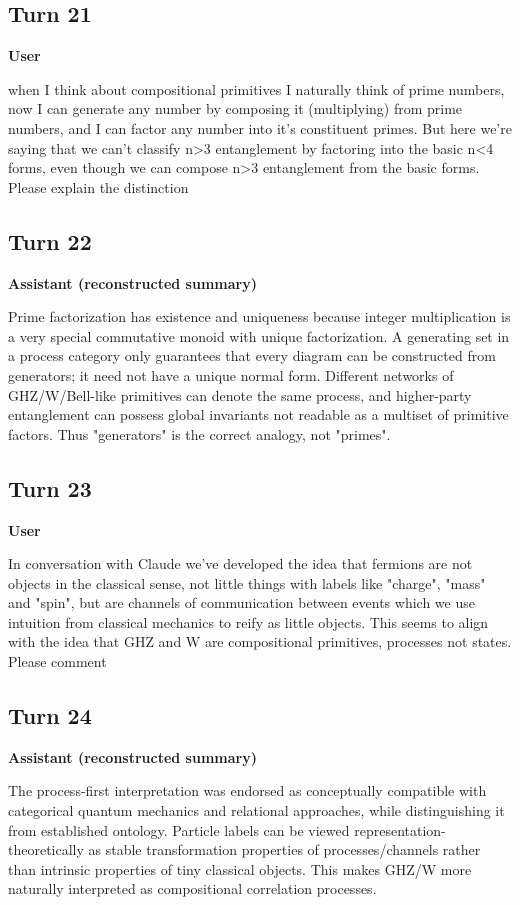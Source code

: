 \documentclass[11pt,a4paper]{article}
\newcommand{\speaker}[1]{\par\medskip\noindent\textbf{\large #1}\par\smallskip}
\begin{document}
\subsection*{Turn 21}
\speaker{User}
when I think about compositional primitives I naturally think of prime numbers, now I can generate any number by composing it (multiplying) from prime numbers, and I can factor any number into it's constituent primes. But here we're saying that we can't classify n>3 entanglement by factoring into the basic n<4 forms, even though we can compose n>3 entanglement from the basic forms. Please explain the distinction
\subsection*{Turn 22}
\speaker{Assistant (reconstructed summary)}
Prime factorization has existence and uniqueness because integer multiplication is a very special commutative monoid with unique factorization. A generating set in a process category only guarantees that every diagram can be constructed from generators; it need not have a unique normal form. Different networks of GHZ/W/Bell-like primitives can denote the same process, and higher-party entanglement can possess global invariants not readable as a multiset of primitive factors. Thus "generators" is the correct analogy, not "primes".
\subsection*{Turn 23}
\speaker{User}
In conversation with Claude we've developed the idea that fermions are not objects in the classical sense, not little things with labels like "charge", "mass" and "spin", but are channels of communication between events which we use intuition from classical mechanics to reify as little objects. This seems to align with the idea that GHZ and W are compositional primitives, processes not states. Please comment
\subsection*{Turn 24}
\speaker{Assistant (reconstructed summary)}
The process-first interpretation was endorsed as conceptually compatible with categorical quantum mechanics and relational approaches, while distinguishing it from established ontology. Particle labels can be viewed representation-theoretically as stable transformation properties of processes/channels rather than intrinsic properties of tiny classical objects. This makes GHZ/W more naturally interpreted as compositional correlation processes.
\end{document}
